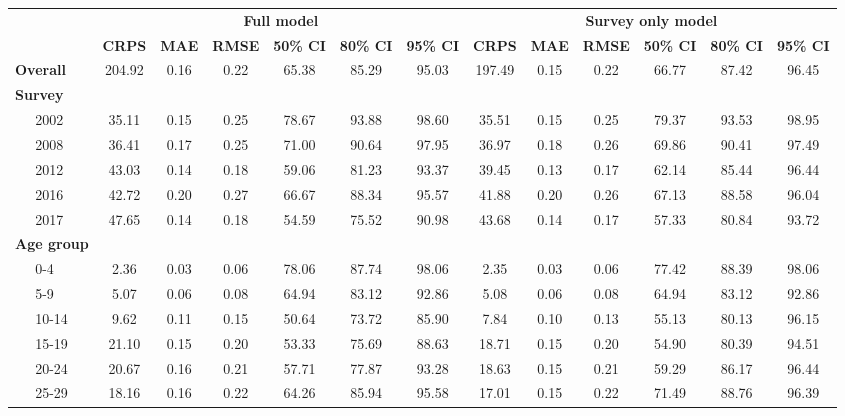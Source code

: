 \documentclass{article}
\begin{document}
\begin{appendix}
\begin{landscape}
{
\begin{table}[H]
\linespread{1}
\footnotesize
    \centering
    \begin{tabular}{ll ccc ccc ccc ccc}
      \hline
       & & \multicolumn{6}{c}{\textbf{Full model}} & \multicolumn{6}{c}{\textbf{Survey only  model}}\\
      \cmidrule(lr){3-8}
      \cmidrule(lr){9-14}
       & & {\bf CRPS} & {\bf MAE} & {\bf RMSE} & {\bf 50\% CI} & {\bf 80\% CI} & {\bf 95\% CI} & {\bf CRPS} & {\bf MAE} & {\bf RMSE} & {\bf 50\% CI} & {\bf 80\% CI} & {\bf 95\% CI} \\[1pt]
      \hline
    \multicolumn{2}{l}{\textbf{Overall}}  & 204.92 & 0.16 & 0.22 & 65.38 & 85.29 & 95.03 & 197.49 & 0.15 & 0.22 & 66.77 & 87.42 &  96.45 \\[5pt] 
    \multicolumn{2}{l}{\textbf{Survey}} \\
    & 2002 &  35.11 & 0.15 & 0.25 & 78.67 & 93.88 & 98.60 &  35.51 & 0.15 & 0.25 & 79.37 & 93.53 &  98.95 \\ 
    & 2008 &  36.41 & 0.17 & 0.25 & 71.00 & 90.64 & 97.95 &  36.97 & 0.18 & 0.26 & 69.86 & 90.41 &  97.49 \\ 
    & 2012 &  43.03 & 0.14 & 0.18 & 59.06 & 81.23 & 93.37 &  39.45 & 0.13 & 0.17 & 62.14 & 85.44 &  96.44 \\ 
    & 2016 &  42.72 & 0.20 & 0.27 & 66.67 & 88.34 & 95.57 &  41.88 & 0.20 & 0.26 & 67.13 & 88.58 &  96.04 \\ 
    & 2017 &  47.65 & 0.14 & 0.18 & 54.59 & 75.52 & 90.98 &  43.68 & 0.14 & 0.17 & 57.33 & 80.84 &  93.72 \\[5pt]
    \multicolumn{2}{l}{\textbf{Age group}} \\
    & 0-4 &   2.36 & 0.03 & 0.06 & 78.06 & 87.74 & 98.06 &   2.35 & 0.03 & 0.06 & 77.42 & 88.39 &  98.06 \\ 
    & 5-9 &   5.07 & 0.06 & 0.08 & 64.94 & 83.12 & 92.86 &   5.08 & 0.06 & 0.08 & 64.94 & 83.12 &  92.86 \\ 
    & 10-14 &   9.62 & 0.11 & 0.15 & 50.64 & 73.72 & 85.90 &   7.84 & 0.10 & 0.13 & 55.13 & 80.13 &  96.15 \\ 
    & 15-19 &  21.10 & 0.15 & 0.20 & 53.33 & 75.69 & 88.63 &  18.71 & 0.15 & 0.20 & 54.90 & 80.39 &  94.51 \\ 
    & 20-24 &  20.67 & 0.16 & 0.21 & 57.71 & 77.87 & 93.28 &  18.63 & 0.15 & 0.21 & 59.29 & 86.17 &  96.44 \\ 
    & 25-29 &  18.16 & 0.16 & 0.22 & 64.26 & 85.94 & 95.58 &  17.01 & 0.15 & 0.22 & 71.49 & 88.76 &  96.39 \\ 

\end{tabular}
\end{table}}
\end{landscape}
\end{appendix}
\end{document}
